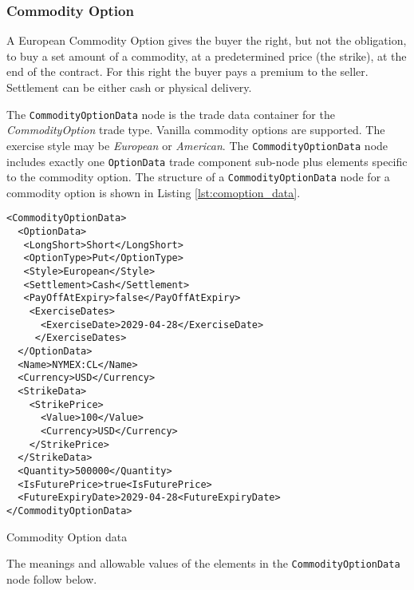 \subsubsection{Commodity Option}
\label{ss:input_commodity_option}

A European Commodity Option gives the buyer the right, but not the obligation, 
to buy a set amount of a commodity, at a predetermined price (the strike), at the 
end of the contract. For this right the buyer pays a premium to the seller. 
Settlement can be either cash or physical delivery.

The \lstinline!CommodityOptionData! node is the trade data container for the \emph{CommodityOption} trade type.  Vanilla commodity 
options are supported. The exercise style may be \emph{European} or \emph{American}. The \lstinline!CommodityOptionData! node includes exactly 
one \lstinline!OptionData! trade component sub-node plus elements specific to the commodity option. The structure of 
a \lstinline!CommodityOptionData! node for a commodity option is shown in Listing \ref{lst:comoption_data}.

\begin{listing}[H]
\begin{verbatim}
<CommodityOptionData>
  <OptionData>
   <LongShort>Short</LongShort>
   <OptionType>Put</OptionType>
   <Style>European</Style>
   <Settlement>Cash</Settlement>
   <PayOffAtExpiry>false</PayOffAtExpiry>
    <ExerciseDates>
      <ExerciseDate>2029-04-28</ExerciseDate>
     </ExerciseDates>
  </OptionData>
  <Name>NYMEX:CL</Name>
  <Currency>USD</Currency>
  <StrikeData>
    <StrikePrice>
      <Value>100</Value>
      <Currency>USD</Currency>
    </StrikePrice>
  </StrikeData>
  <Quantity>500000</Quantity>
  <IsFuturePrice>true<IsFuturePrice>
  <FutureExpiryDate>2029-04-28<FutureExpiryDate>
</CommodityOptionData>
\end{verbatim}
\caption{Commodity Option data}
\label{lst:comoption_data}
\end{listing}

The meanings and allowable values of the elements in the \lstinline!CommodityOptionData!  node follow below.

